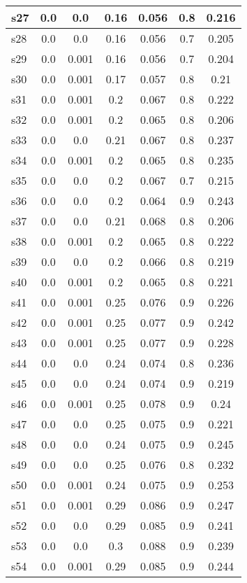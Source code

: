 \documentclass{article}
\begin{document}
\begin{tabular}{|l|c|c|c|c|c|c|}
\hline
s27 &0.0 & 0.0 & 0.16 & 0.056 & 0.8 & 0.216\\
\hline
s28 &0.0 & 0.0 & 0.16 & 0.056 & 0.7 & 0.205\\
\hline
s29 &0.0 & 0.001 & 0.16 & 0.056 & 0.7 & 0.204\\
\hline
s30 &0.0 & 0.001 & 0.17 & 0.057 & 0.8 & 0.21\\
\hline
s31 &0.0 & 0.001 & 0.2 & 0.067 & 0.8 & 0.222\\
\hline
s32 &0.0 & 0.001 & 0.2 & 0.065 & 0.8 & 0.206\\
\hline
s33 &0.0 & 0.0 & 0.21 & 0.067 & 0.8 & 0.237\\
\hline
s34 &0.0 & 0.001 & 0.2 & 0.065 & 0.8 & 0.235\\
\hline
s35 &0.0 & 0.0 & 0.2 & 0.067 & 0.7 & 0.215\\
\hline
s36 &0.0 & 0.0 & 0.2 & 0.064 & 0.9 & 0.243\\
\hline
s37 &0.0 & 0.0 & 0.21 & 0.068 & 0.8 & 0.206\\
\hline
s38 &0.0 & 0.001 & 0.2 & 0.065 & 0.8 & 0.222\\
\hline
s39 &0.0 & 0.0 & 0.2 & 0.066 & 0.8 & 0.219\\
\hline
s40 &0.0 & 0.001 & 0.2 & 0.065 & 0.8 & 0.221\\
\hline
s41 &0.0 & 0.001 & 0.25 & 0.076 & 0.9 & 0.226\\
\hline
s42 &0.0 & 0.001 & 0.25 & 0.077 & 0.9 & 0.242\\
\hline
s43 &0.0 & 0.001 & 0.25 & 0.077 & 0.9 & 0.228\\
\hline
s44 &0.0 & 0.0 & 0.24 & 0.074 & 0.8 & 0.236\\
\hline
s45 &0.0 & 0.0 & 0.24 & 0.074 & 0.9 & 0.219\\
\hline
s46 &0.0 & 0.001 & 0.25 & 0.078 & 0.9 & 0.24\\
\hline
s47 &0.0 & 0.0 & 0.25 & 0.075 & 0.9 & 0.221\\
\hline
s48 &0.0 & 0.0 & 0.24 & 0.075 & 0.9 & 0.245\\
\hline
s49 &0.0 & 0.0 & 0.25 & 0.076 & 0.8 & 0.232\\
\hline
s50 &0.0 & 0.001 & 0.24 & 0.075 & 0.9 & 0.253\\
\hline
s51 &0.0 & 0.001 & 0.29 & 0.086 & 0.9 & 0.247\\
\hline
s52 &0.0 & 0.0 & 0.29 & 0.085 & 0.9 & 0.241\\
\hline
s53 &0.0 & 0.0 & 0.3 & 0.088 & 0.9 & 0.239\\
\hline
s54 &0.0 & 0.001 & 0.29 & 0.085 & 0.9 & 0.244\\

\end{tabular}
\end{document}
